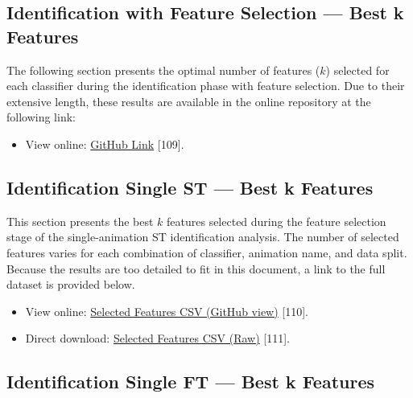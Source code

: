 \documentclass{article}
\begin{document}
\FloatBarrier

\subsection{Identification with Feature Selection — Best k Features}
\label{subsec:id_fs_k}

The following section presents the optimal number of features ($k$) selected for each classifier during the identification phase with feature selection.
Due to their extensive length, these results are available in the online repository at the following link:

\begin{itemize}
    \item View online: 
    \href{https://github.com/DavideMascheroni99/movingText/tree/main/Programs/Machine_Learning/Machine_Learning_results/Identification_results/Identification_KBest/Feature}
    {GitHub Link} [109].
\end{itemize}
\FloatBarrier

\subsection{Identification Single ST — Best k Features}

This section presents the best $k$ features selected during the feature selection stage of the single-animation ST identification analysis.
The number of selected features varies for each combination of classifier, animation name, and data split. 
Because the results are too detailed to fit in this document, a link to the full dataset is provided below.

\begin{itemize}
    \item View online: 
    \href{https://github.com/DavideMascheroni99/movingText/blob/main/Programs/Machine_Learning/Machine_Learning_results/Identification_single_results/selected_features_st.csv}
    {Selected Features CSV (GitHub view)} [110].
    \item Direct download: 
    \href{https://github.com/DavideMascheroni99/movingText/raw/main/Programs/Machine_Learning/Machine_Learning_results/Identification_single_results/selected_features_st.csv}
    {Selected Features CSV (Raw)} [111].
\end{itemize}
\FloatBarrier

\subsection{Identification Single FT — Best k Features}
\label{subsec:topk_ft}
\end{document}
